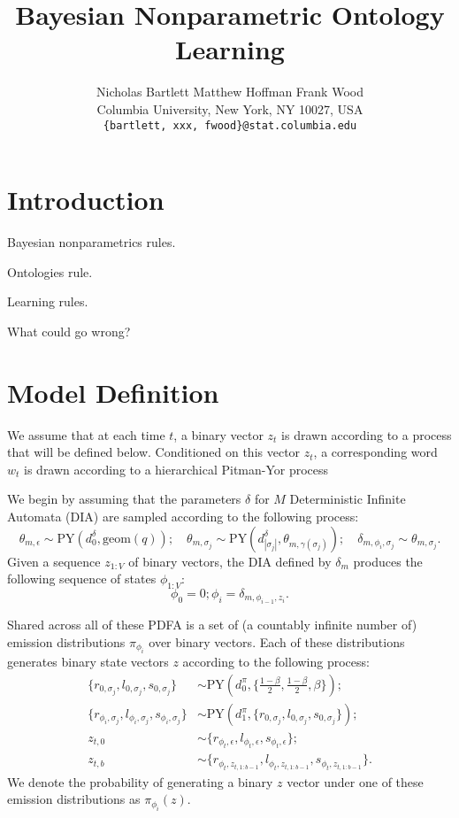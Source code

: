 \documentclass{article}
\title{Bayesian Nonparametric Ontology Learning}
\author{
Nicholas Bartlett \hspace{1cm} Matthew Hoffman \hspace{1cm} Frank Wood\\
Columbia University, New York, NY 10027, USA \\
\texttt{\{bartlett, xxx, fwood\}@stat.columbia.edu}
}
\newcommand{\PY}{\textrm{PY}}
\newcommand{\geom}{\textrm{geom}}
\begin{document}
\maketitle

\section{Introduction}

Bayesian nonparametrics rules.

Ontologies rule.

Learning rules.

What could go wrong?

\section{Model Definition}
We assume that at each time $t$, a binary vector $z_t$ is drawn
according to a process that will be defined below. Conditioned on this
vector $z_t$, a corresponding word $w_t$ is drawn according to a
hierarchical Pitman-Yor process

We begin by assuming that the parameters $\delta$ for $M$
Deterministic Infinite Automata (DIA) are sampled according to the
following process:
\begin{equation}
\theta_{m,\epsilon} \sim \PY(d^{\delta}_{0},\geom(q)); \quad
\theta_{m,\sigma_j} \sim \PY(d^{\delta}_{|\sigma_j|},
\theta_{m,\gamma(\sigma_j)}); \quad
\delta_{m,\phi_i,\sigma_j} \sim \theta_{m,\sigma_j}.
\end{equation}
Given a sequence $z_{1:V}$ of binary vectors, the DIA defined by
$\delta_m$ produces the following sequence of states $\phi_{1:V}$:
\begin{equation}
\phi_0 = 0; \phi_i = \delta_{m, \phi_{i-1}, z_i}.
\end{equation}



Shared across all of these PDFA is a set of (a countably infinite
number of) emission distributions $\pi_{\phi_i}$ over binary
vectors. Each of these distributions generates binary state vectors
$z$ according to the following process:
\begin{equation}
\begin{split}
\{r_{0,\sigma_j}, l_{0,\sigma_j}, s_{0,\sigma_j}\} &\sim \PY(d^\pi_{0}, 
\{\frac{1-\beta}{2}, \frac{1-\beta}{2}, \beta\}); \\
\{r_{\phi_i,\sigma_j}, l_{\phi_i,\sigma_j}, s_{\phi_i,\sigma_j}\} &\sim \PY(d^\pi_{1}, 
\{r_{0,\sigma_j}, l_{0,\sigma_j}, s_{0,\sigma_j}\}); \\
z_{t,0} &\sim \{r_{\phi_t, \epsilon}, l_{\phi_t, \epsilon}, 
s_{\phi_t, \epsilon}\}; \\
z_{t,b} &\sim \{r_{\phi_t, z_{t,1:b-1}}, l_{\phi_t, z_{t,1:b-1}}, 
s_{\phi_t, z_{t,1:b-1}}\}.
\end{split}
\end{equation}
We denote the probability of generating a binary $z$ vector under
one of these emission distributions as $\pi_{\phi_i}(z)$.
\end{document}
